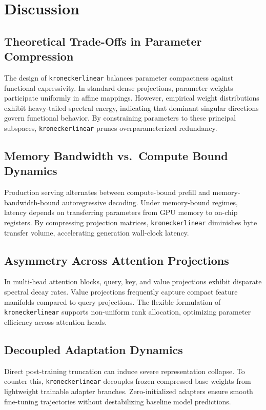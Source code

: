 \section{Discussion}

\subsection{Theoretical Trade-Offs in Parameter Compression}
The design of \texttt{kroneckerlinear} balances parameter compactness against functional expressivity. In standard dense projections, parameter weights participate uniformly in affine mappings. However, empirical weight distributions exhibit heavy-tailed spectral energy, indicating that dominant singular directions govern functional behavior. By constraining parameters to these principal subspaces, \texttt{kroneckerlinear} prunes overparameterized redundancy.

\subsection{Memory Bandwidth vs.\ Compute Bound Dynamics}
Production serving alternates between compute-bound prefill and memory-bandwidth-bound autoregressive decoding. Under memory-bound regimes, latency depends on transferring parameters from GPU memory to on-chip registers. By compressing projection matrices, \texttt{kroneckerlinear} diminishes byte transfer volume, accelerating generation wall-clock latency.

\subsection{Asymmetry Across Attention Projections}
In multi-head attention blocks, query, key, and value projections exhibit disparate spectral decay rates. Value projections frequently capture compact feature manifolds compared to query projections. The flexible formulation of \texttt{kroneckerlinear} supports non-uniform rank allocation, optimizing parameter efficiency across attention heads.

\subsection{Decoupled Adaptation Dynamics}
Direct post-training truncation can induce severe representation collapse. To counter this, \texttt{kroneckerlinear} decouples frozen compressed base weights from lightweight trainable adapter branches. Zero-initialized adapters ensure smooth fine-tuning trajectories without destabilizing baseline model predictions.

